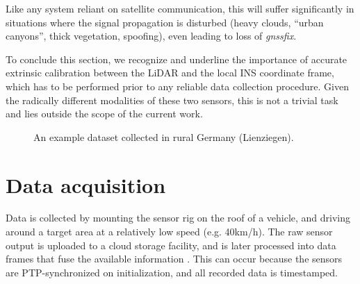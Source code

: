 Like any system reliant on satellite communication, this will suffer significantly in situations where the signal propagation is disturbed (heavy clouds, ``urban canyons'', thick vegetation, spoofing), even leading to loss of \emph{\gls{gnssfix}}.

To conclude this section, we recognize and underline the importance of accurate extrinsic calibration between the LiDAR and the local INS coordinate frame, which has to be performed prior to any reliable data collection procedure. Given the radically different modalities of these two sensors, this is not a trivial task \cite{lidar-gps-calib} and lies outside the scope of the current work.

\begin{figure}
    \centering
    \hspace{1pt}
    \caption[Example dataset trajectory]{An example dataset collected in rural Germany (Lienziegen).}
    \label{fig:example-trajectory}
\end{figure}


\section{Data acquisition}

Data is collected by mounting the sensor rig on the roof of a vehicle, and driving around a target area at a relatively low speed (e.g. 40km/h). 
The raw sensor output is uploaded to a cloud storage facility, and is later processed into data frames that fuse the available information . This can occur because the sensors are PTP-synchronized on initialization, and all recorded data is timestamped.

